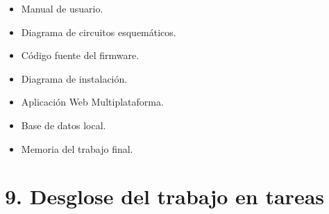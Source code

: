 \documentclass[
11pt, %
]{charter}
\begin{document}
\begin{itemize}
	\item Manual de usuario.
	\item Diagrama de circuitos esquemáticos.
	\item Código fuente del firmware.
	\item Diagrama de instalación.
	\item Aplicación Web Multiplataforma.
	\item Base de datos local.
	\item Memoria del trabajo final.
\end{itemize}


\section{9. Desglose del trabajo en tareas}
\label{sec:wbs}
\end{document}

